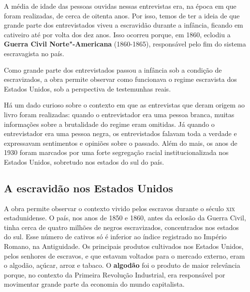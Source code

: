 \documentclass[11pt]{extarticle}
\begin{document}
A média de idade das pessoas ouvidas nessas entrevistas era, na época em
que foram realizadas, de cerca de oitenta anos. Por isso, temos de ter a
ideia de que grande parte dos entrevistados viveu a escravidão durante a
infância, ficando em cativeiro até por volta dos dez anos. Isso ocorreu
porque, em 1860, eclodiu a \textbf{Guerra Civil Norte"-Americana}
(1860-1865), responsável pelo fim do sistema escravagista no país.

Como grande parte dos entrevistados passou a infância sob a condição de
escravizados, a obra permite observar como funcionava o regime
escravista dos Estados Unidos, sob a perspectiva de testemunhas reais.






Há um dado curioso sobre o contexto em que as entrevistas que deram
origem ao livro foram realizadas: quando o entrevistador era uma pessoa
branca, muitas informações sobre a brutalidade do regime eram omitidas.
Já quando o entrevistador era uma pessoa negra, os entrevistados falavam
toda a verdade e expressavam sentimentos e opiniões sobre o passado.
Além do mais, os anos de 1930 foram marcados por uma forte segregação
racial institucionalizada nos Estados Unidos, sobretudo nos estados do
sul do país.

\subsection{A escravidão nos Estados Unidos}

A obra permite observar o contexto vivido pelos escravos durante o
século \textsc{xix} estadunidense. O país, nos anos de 1850 e 1860, antes da
eclosão da Guerra Civil, tinha cerca de quatro milhões de negros
escravizados, concentrados nos estados do sul. Esse número de cativos só
é inferior ao índice registrado no Império Romano, na Antiguidade. Os
principais produtos cultivados nos Estados Unidos, pelos senhores de
escravos, e que estavam voltados para o mercado externo, eram o algodão,
açúcar, arroz e tabaco. O \textbf{algodão} foi o produto de maior
relevância porque, no contexto da Primeira Revolução Industrial, era
responsável por movimentar grande parte da economia do mundo
capitalista.

\end{document}
